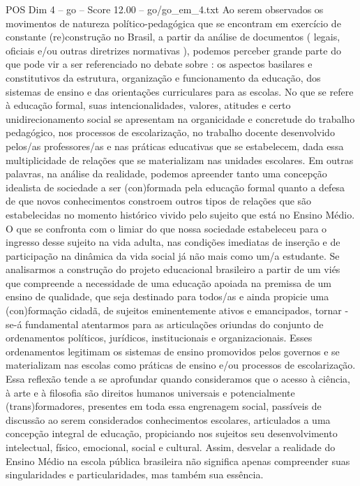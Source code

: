 \begin{textsample}{POS Dim 4 – go – Score 12.00 – go/go\_em\_4.txt}
Ao serem observados os movimentos de natureza político-pedagógica que se encontram em exercício de constante (re)construção no Brasil, a partir da análise de documentos ( legais, oficiais e/ou outras diretrizes normativas ), podemos perceber grande parte do que pode vir a ser referenciado no debate sobre : os aspectos basilares e constitutivos da estrutura, organização e funcionamento da educação, dos sistemas de ensino e das orientações curriculares para as escolas.
No que se refere à educação formal, suas intencionalidades, valores, atitudes e certo unidirecionamento social se apresentam na organicidade e concretude do trabalho pedagógico, nos processos de escolarização, no trabalho docente desenvolvido pelos/as professores/as e nas práticas educativas que se estabelecem, dada essa multiplicidade de relações que se materializam nas unidades escolares.
Em outras palavras, na análise da realidade, podemos apreender tanto uma concepção idealista de sociedade a ser (con)formada pela educação formal quanto a defesa de que novos conhecimentos constroem outros tipos de relações que são estabelecidas no momento histórico vivido pelo sujeito que está no Ensino Médio.
O que se confronta com o limiar do que nossa sociedade estabeleceu para o ingresso desse sujeito na vida adulta, nas condições imediatas de inserção e de participação na dinâmica da vida social já não mais como um/a estudante.
Se analisarmos a construção do projeto educacional brasileiro a partir de um viés que compreende a necessidade de uma educação apoiada na premissa de um ensino de qualidade, que seja destinado para todos/as e ainda propicie uma (con)formação cidadã, de sujeitos eminentemente ativos e emancipados, tornar -se-á fundamental atentarmos para as articulações oriundas do conjunto de ordenamentos políticos, jurídicos, institucionais e organizacionais.
Esses ordenamentos legitimam os sistemas de ensino promovidos pelos governos e se materializam nas escolas como práticas de ensino e/ou processos de escolarização.
Essa reflexão tende a se aprofundar quando consideramos que o acesso à ciência, à arte e à filosofia são direitos humanos universais e potencialmente (trans)formadores, presentes em toda essa engrenagem social, passíveis de discussão ao serem considerados conhecimentos escolares, articulados a uma concepção integral de educação, propiciando nos sujeitos seu desenvolvimento intelectual, físico, emocional, social e cultural.
Assim, desvelar a realidade do Ensino Médio na escola pública brasileira não significa apenas compreender suas singularidades e particularidades, mas também sua essência.

\end{textsample}
